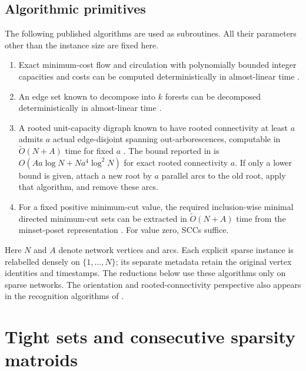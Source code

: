 \documentclass[11pt,a4paper]{article}
\theoremstyle{definition}
\theoremstyle{remark}
\newcommand{\softO}{\widetilde O}
\begin{document}
\subsection{Algorithmic primitives}

The following published algorithms are used as subroutines.
All their parameters other than the instance size are fixed here.
\begin{enumerate}
 \item Exact minimum-cost flow and circulation with polynomially
 bounded integer capacities and costs can be computed
 deterministically in almost-linear time \cite{mcf}.
 \item An edge set known to decompose into $k$ forests can be
 decomposed deterministically in almost-linear time \cite{forest}.
 \item A rooted unit-capacity digraph known to have rooted
 connectivity at least $a$ admits $a$ actual edge-disjoint spanning
 out-arborescences, computable in $\softO(N+A)$ time for fixed
 $a$ \cite{arborescences}. The bound reported in
 \cite{arbo-study} is
 $O(Aa\log N+Na^4\log^2N)$ for exact rooted connectivity $a$.
 If only a lower bound is given, attach a new root by $a$ parallel
 arcs to the old root, apply that algorithm, and remove these arcs.
 \item For a fixed positive minimum-cut value, the required
 inclusion-wise minimal directed minimum-cut sets can be extracted
 in $\softO(N+A)$ time from the minset-poset representation
 \cite{minset,minset-2026}. For value zero, SCCs suffice.
\end{enumerate}
Here $N$ and $A$ denote network vertices and arcs. Each explicit
sparse instance is relabelled densely on $\{1,\ldots,N\}$; its
separate metadata retain the original vertex identities and timestamps.
The reductions below use these algorithms only on sparse networks.
The orientation and rooted-connectivity perspective also appears
in the recognition algorithms of \cite{recognition}.

\section{Tight sets and consecutive sparsity matroids}
\label{sec:matroids}
\end{document}
